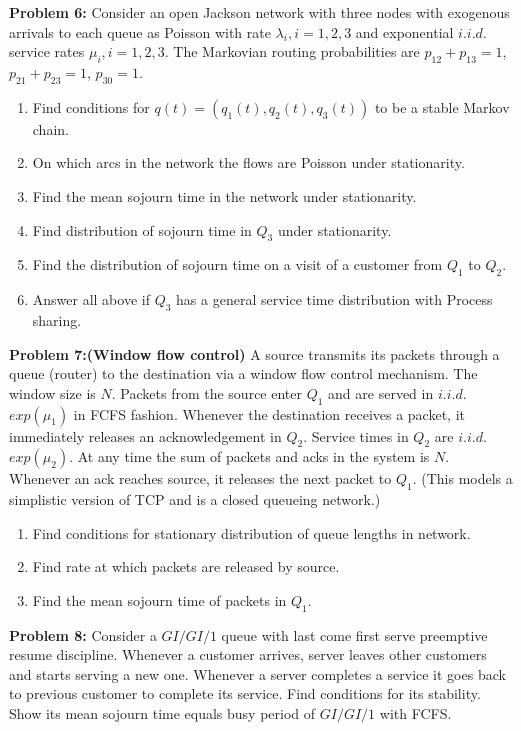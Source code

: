 \documentclass[all-lectures.tex]{subfiles}
\begin{document}
\noindent \textbf{Problem 6:}
Consider an open Jackson network with three nodes with exogenous arrivals to each queue as Poisson with rate $\lambda_i, i=1,2,3$ and exponential $i.i.d.$ service rates $\mu_i, i=1,2,3$.
The Markovian routing probabilities are $p_{12}+p_{13}=1$, $p_{21}+p_{23}=1$, $p_{30}=1$.
\begin{enumerate}
\item Find conditions for $q(t)=(q_1(t), q_2(t), q_3(t))$ to be a stable Markov chain.
\item On which arcs in the network the flows are Poisson under stationarity.
\item Find the mean sojourn time in the network under stationarity.
\item Find distribution of sojourn time in $Q_3$ under stationarity.
\item Find the distribution of sojourn time on a visit of a customer from $Q_1$ to $Q_2$.
\item Answer all above if $Q_3$ has a general service time distribution with Process sharing.
\end{enumerate}

\noindent \textbf{Problem 7:(Window flow control)} A source transmits its packets through a queue (router) to the destination via a window flow control mechanism.
The window size is $N$.
Packets from the source enter $Q_1$ and are served in $i.i.d.$ $exp(\mu_1)$ in FCFS fashion.
Whenever the destination receives a packet, it immediately releases an acknowledgement in $Q_2$.
Service times in $Q_2$ are $i.i.d.$ $exp(\mu_2)$.
At any time the sum of packets and acks in the system is $N$. 
Whenever an ack reaches source, it releases the next packet to $Q_1$.
(This models a simplistic version of TCP and is a closed queueing network.)
\begin{enumerate}
\item Find conditions for stationary distribution of queue lengths in network.
\item Find rate at which packets are released by source.
\item Find the mean sojourn time of packets in $Q_1$.
\end{enumerate}

\noindent \textbf{Problem 8:} Consider a $GI/GI/1$ queue with last come first serve preemptive resume discipline.
Whenever a customer arrives, server leaves other customers and starts serving a new one.
Whenever a server completes a service it goes back to previous customer to complete its service. 
Find conditions for its stability.
Show its mean sojourn time equals busy period of $GI/GI/1$ with FCFS.
\end{document}
